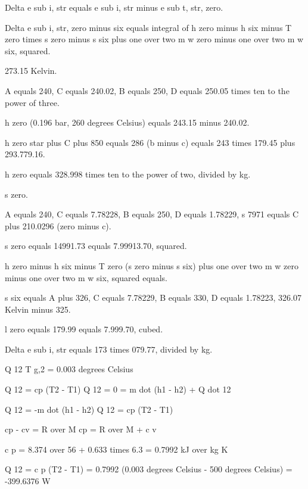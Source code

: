 Delta e sub i, str equals e sub i, str minus e sub t, str, zero.

Delta e sub i, str, zero minus six equals integral of h zero minus h six minus T zero times s zero minus s six plus one over two m w zero minus one over two m w six, squared.

273.15 Kelvin.

A equals 240, C equals 240.02, B equals 250, D equals 250.05 times ten to the power of three.

h zero (0.196 bar, 260 degrees Celsius) equals 243.15 minus 240.02.

h zero star plus C plus 850 equals 286 (b minus c) equals 243 times 179.45 plus 293.779.16.

h zero equals 328.998 times ten to the power of two, divided by kg.

s zero.

A equals 240, C equals 7.78228, B equals 250, D equals 1.78229, s 7971 equals C plus 210.0296 (zero minus c).

s zero equals 14991.73 equals 7.99913.70, squared.

h zero minus h six minus T zero (s zero minus s six) plus one over two m w zero minus one over two m w six, squared equals.

s six equals A plus 326, C equals 7.78229, B equals 330, D equals 1.78223, 326.07 Kelvin minus 325.

l zero equals 179.99 equals 7.999.70, cubed.

Delta e sub i, str equals 173 times 079.77, divided by kg.

Q 12  
T g,2 = 0.003 degrees Celsius  

Q 12 = cp (T2 - T1)  
Q 12 = 0 = m dot (h1 - h2) + Q dot 12  

Q 12 = -m dot (h1 - h2)  
Q 12 = cp (T2 - T1)  

cp - cv = R over M  
cp = R over M + c v  

c p = 8.374 over 56 + 0.633 times 6.3 = 0.7992 kJ over kg K  

Q 12 = c p (T2 - T1) = 0.7992 (0.003 degrees Celsius - 500 degrees Celsius) = -399.6376 W